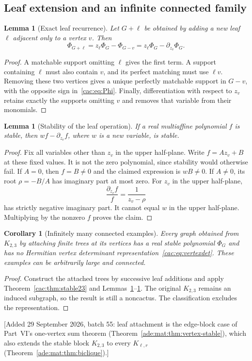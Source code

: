 \documentclass[11pt]{article}
\numberwithin{equation}{section}
\newtheorem{lemma}[theorem]{Lemma}
\newtheorem{corollary}[theorem]{Corollary}
\theoremstyle{definition}
\begin{document}
\subsection{Leaf extension and an infinite connected family}

\begin{lemma}[Exact leaf recurrence]
\label{cac:lem:leaf}
Let $G+\ell$ be obtained by adding a new leaf $\ell$ adjacent only to a vertex $v$. Then
\begin{equation}
 \Phi_{G+\ell}=z_\ell\Phi_G-\Phi_{G-v}
             =z_\ell\Phi_G-\partial_{z_v}\Phi_G.
 \label{cac:eq:leaf}
\end{equation}
\end{lemma}
\begin{proof}
A matchable support omitting $\ell$ gives the first term. A support containing $\ell$ must also contain $v$, and its perfect matching must use $\ell v$. Removing these two vertices gives a unique perfectly matchable support in $G-v$, with the opposite sign in~\eqref{cac:eq:Phi}. Finally, differentiation with respect to $z_v$ retains exactly the supports omitting $v$ and removes that variable from their monomials.
\end{proof}

\begin{lemma}[Stability of the leaf operation]
\label{cac:lem:leafstable}
If a real multiaffine polynomial $f$ is stable, then $wf-\partial_{z_v}f$, where $w$ is a new variable, is stable.
\end{lemma}
\begin{proof}
Fix all variables other than $z_v$ in the upper half-plane. Write $f=Az_v+B$ at these fixed values. It is not the zero polynomial, since stability would otherwise fail. If $A=0$, then $f=B\ne0$ and the claimed expression is $wB\ne0$. If $A\ne0$, its root $\rho=-B/A$ has imaginary part at most zero. For $z_v$ in the upper half-plane,
\[
 \frac{\partial_{z_v}f}{f}=\frac1{z_v-\rho}
\]
has strictly negative imaginary part. It cannot equal $w$ in the upper half-plane. Multiplying by the nonzero $f$ proves the claim.
\end{proof}

\begin{corollary}[Infinitely many connected examples]
\label{cac:cor:trees}
Every graph obtained from $K_{2,3}$ by attaching finite trees at its vertices has a real stable polynomial $\Phi_G$ and has no Hermitian vertex determinant representation~\eqref{cac:eq:vertexdet}. These examples can be arbitrarily large and connected.
\end{corollary}
\begin{proof}
Construct the attached trees by successive leaf additions and apply Theorem~\ref{cac:thm:stable23} and Lemmas~\ref{cac:lem:leaf}--\ref{cac:lem:leafstable}. The original $K_{2,3}$ remains an induced subgraph, so the result is still a noncactus. The classification excludes the representation.
\end{proof}
[Added 29 September 2026, batch 55: leaf attachment is the edge-block case of Part~VI's one-vertex sum theorem (Theorem~\ref{ade:mat:thm:vertex-stable}), which also extends the stable block $K_{2,3}$ to every $K_{\ell,r}$ (Theorem~\ref{ade:mat:thm:biclique}).]
\end{document}
